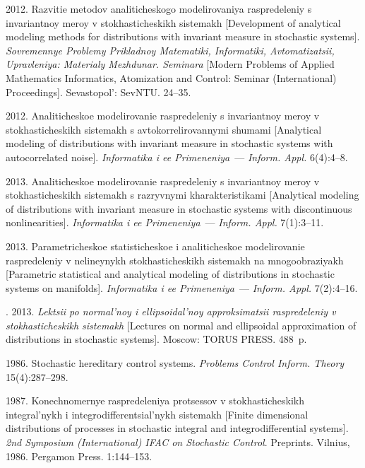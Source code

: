\begin{multicols}{2}
{{\begin{thebibliography}{99}
 2012.
 Razvitie metodov analiticheskogo modelirovaniya raspredeleniy s invariantnoy
 meroy v stokhasticheskikh sistemakh [Development of analytical modeling
 methods for distributions with invariant measure in stochastic systems].
 \textit{Sovremennye Problemy Prikladnoy Matematiki, Informatiki, Avtomatizatsii,
 Upravleniya: Materialy Mezhdunar. Seminara}
 [Modern Problems of Applied Mathematics Informatics, Atomization and Control:
 Seminar (International) Proceedings].
 Sevastopol':  SevNTU. 24--35.

 2012.
 Analiticheskoe modelirovanie raspredeleniy s invariantnoy meroy v
 stokhasticheskikh sistemakh s avtokorrelirovannymi shumami
 [Analytical modeling of distributions with invariant measure in stochastic
 systems with autocorrelated noise].
 \textit{Informatika i ee Primeneniya}~--- \textit{Inform. Appl.} 6(4):4--8.

  2013.
Analiticheskoe modelirovanie raspredeleniy s invariantnoy meroy v
stokhasticheskikh sistemakh s razryvnymi kharakteristikami
[Analytical modeling of distributions with invariant measure in stochastic
systems with discontinuous nonlinearities].
\textit{Informatika i ee Primeneniya}~--- \textit{Inform. Appl.} 7(1):3--11.

  2013.
Parametricheskoe statisticheskoe i analiticheskoe modelirovanie raspredeleniy
v nelineynykh stokhasticheskikh sistemakh na mnogoobraziyakh
[Parametric statistical and analytical modeling of distributions in stochastic
systems on manifolds].
\textit{Informatika i ee Primeneniya}~--- \textit{Inform. Appl.} 7(2):4--16.

.  2013.
\textit{Lektsii po normal'noy i ellipsoidal'noy approksimatsii raspredeleniy
v stokhasticheskikh sistemakh} [Lectures on normal and ellipsoidal
approximation of distributions in stochastic systems].
Moscow: TORUS PRESS. 488~p.

  1986.
{Stochastic hereditary control systems}.
\textit{Problems Control Inform. Theory} 15(4):287--298.


  1987.
Konechnomernye raspredeleniya protsessov v stokhasticheskikh integral'nykh i
integ\-ro\-dif\-fe\-ren\-tsi\-al'nykh sistemakh [Finite dimensional distributions
of processes in stochastic integral and integrodifferential systems].
\textit{2nd Symposium (International) IFAC on Stochastic Control}.
Preprints. Vilnius, 1986. Pergamon Press. 1:144--153.


\end{thebibliography}}}
\end{multicols}

